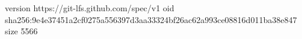 version https://git-lfs.github.com/spec/v1
oid sha256:9e4e37451a2cf0275a556397d3aa33324bf26ac62a993ce08816d011ba38e847
size 5566
